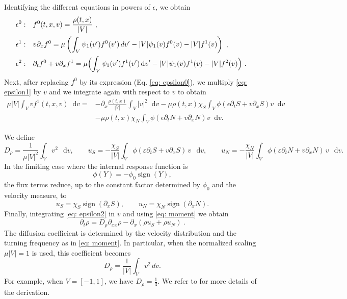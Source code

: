 \documentclass[11pt,twoside]{article}
\numberwithin{equation}{section}
\DeclareMathOperator{\sign}{sign}
\newcommand*\diff{\mathop{}\!\mathrm{d}}
\theoremstyle{plain}
\theoremstyle{nonumberplain}
\begin{document}
\noindent Identifying the different equations in powers of $\epsilon$, we obtain
\fi
\begin{align}
    \epsilon^0: & \quad f^0(t,{x},{v})=\frac{\rho(t,{x})}{|V|}\ ,\label{eq: epsilon0}\\
    \epsilon^1: & \quad 
    v \partial_x f^0
=
\mu \left(
\int_V \psi_1(v') f^0(v')\,dv'
- |V| \psi_1(v) f^0(v)
- |V| f^1(v)
\right)\ ,\label{eq: epsilon1}\\
    \epsilon^2: & \quad \partial_tf^0+{v}\partial_x f^1 =\mu\Bigl(\int_V\psi_1(v')f^1(v')\diff v'-|V|\psi_1(v)f^1(v)-|V|f^2(v)\Bigr) \ \label{eq: epsilon2}.\
\end{align}
Next, after replacing $f^0$ by its expression (Eq. \eqref{eq: epsilon0}), we multiply \eqref{eq: epsilon1} by ${v}$ and we integrate again with respect to ${v}$ to obtain
\begin{align}
    \mu|V|\int_V vf^1(t,x,v) \diff v=&-\partial_x\frac{\rho(t,x)}{|V|}\int_V |v|^2\diff v-\mu\rho(t,x)\chi_S\int_V\phi(\epsilon\partial_tS+v\partial_xS)v\diff v\nonumber\\ &-\mu\rho(t,x)\chi_N\int_V\phi(\epsilon\partial_tN+v\partial_xN)v\diff v.\label{eq: mean direction}
\end{align}

We define
\begin{equation}
D_\rho
=
\frac{1}{\mu |V|^2}\int_V v^2\,\diff v,
\qquad
u_S
=
-\frac{\chi_S}{|V|}
\int_V \phi(\varepsilon\partial_t S+v\partial_x S)\,v\,\diff v,
\qquad
u_N
=
-\frac{\chi_N}{|V|}
\int_V \phi(\varepsilon\partial_t N+v\partial_x N)\,v\,\diff v .
\label{eq: moment}
\end{equation}
In the limiting case where the internal response function is
\[
\phi(Y)=-\phi_0\sign(Y),
\]
the flux terms reduce, up to the constant factor determined by
$\phi_0$ and the velocity measure, to
\[
u_S=\chi_S\sign(\partial_x S),
\qquad
u_N=\chi_N\sign(\partial_x N).
\]
Finally, integrating \eqref{eq: epsilon2} in ${v}$ and using \eqref{eq: moment} we obtain
\[
\partial_t\rho=D_\rho\partial_{xx}\rho-\partial_x(\rho u_S+\rho u_N)\ .
\]
{\color{red}
The diffusion coefficient is determined by the velocity distribution and
the turning frequency as in \eqref{eq: moment}. 
In particular, when the normalized scaling \(\mu |V|=1\) is used, this
coefficient becomes
\begin{equation}
\label{def:Drho}
  D_\rho
=
\frac1{|V|}
\int_V v^2\,dv .  
\end{equation}
For example, when \( V = [-1,1] \), we have $D_\rho = \frac{1}{3}$.
}
We refer to \cite{emako2015existence,emako2016traveling} for more details of the derivation.
\end{document}
